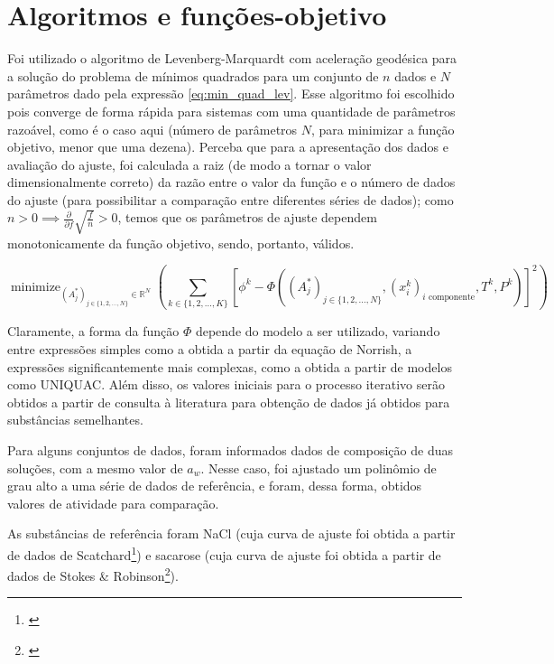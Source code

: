 \documentclass[
	12pt,				%
	openright,
	twoside,
	a4paper,			%
	english,			%
	french,				%
	brazil				%
	]{abntex2}
\DeclareMathOperator*{\minimize}{minimize}
\begin{document}
\chapter{Algoritmos e funções-objetivo}

Foi utilizado o algoritmo de Levenberg-Marquardt com aceleração geodésica para a
solução do problema de mínimos quadrados para um conjunto de $n$ dados e $N$
parâmetros dado pela expressão \ref{eq:min_quad_lev}.
Esse algoritmo foi escolhido pois converge de forma rápida para sistemas com
uma quantidade de parâmetros razoável, como é o caso aqui (número de parâmetros
$N$, para minimizar a função objetivo, menor que uma dezena).
Perceba que para a apresentação dos dados e avaliação do ajuste, foi calculada a
raiz (de modo a tornar o valor dimensionalmente correto) da razão entre o valor da
função e o número de dados do ajuste (para possibilitar a comparação entre
diferentes séries de dados); como
$n>0 \implies \frac{\partial}{\partial f}\sqrt{\frac{f}{n}} >0$, temos que os
parâmetros de ajuste dependem monotonicamente da função objetivo, sendo, portanto,
válidos.

\begin{equation}
	\label{eq:min_quad_lev}
	\minimize_{(A_j^*)_{j \in \{1,2,\ldots,N\}} \in \mathbb{R}^N}%
	\left(\sum_{k \in \{1,2,\ldots,K\}}\left[\phi^k - \Phi((A^*_j)_{j%
	\in \{1, 2, \ldots, N\}}, (x^k_i)_\text{$i$ componente},%
	T^k, P^k)\right]^2\right)
\end{equation}

Claramente, a forma da função $\Phi$ depende do modelo a ser utilizado, variando
entre expressões simples como a obtida a partir da equação de Norrish, a
expressões significantemente mais complexas, como a obtida a partir de modelos
como UNIQUAC. Além disso, os valores iniciais para o processo iterativo serão
obtidos a partir de consulta à literatura para obtenção de dados já obtidos para
substâncias semelhantes.

Para alguns conjuntos de dados, foram informados dados de composição de duas
soluções, com a mesmo valor de $a_w$. Nesse caso, foi ajustado um polinômio
de grau alto a uma série de dados de referência, e foram, dessa forma, obtidos
valores de atividade para comparação.

As substâncias de referência foram NaCl (cuja curva de ajuste foi obtida a
partir de dados de Scatchard\footnote{\cite{scatchard1938}}) e sacarose (cuja
curva de ajuste foi obtida a partir de dados de Stokes \& Robinson\footnote{%
\cite{stokes1961}}).
\end{document}
